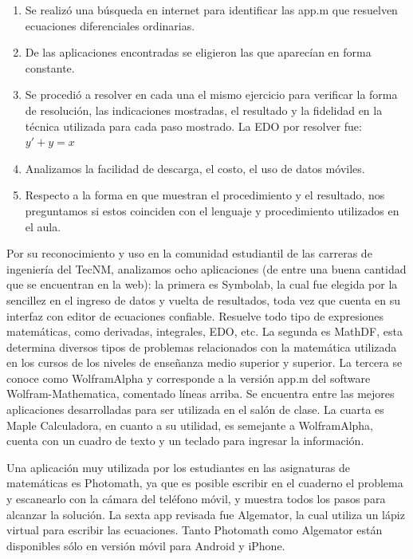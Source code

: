 \documentclass[spanish]{textolivre}
\begin{document}
\begin{enumerate}[label=(\alph*)]
\item Se realizó una búsqueda en internet para identificar las app.m que resuelven ecuaciones diferenciales ordinarias.
\item De las aplicaciones encontradas se eligieron las que aparecían en forma constante.
\item Se procedió a resolver en cada una el mismo ejercicio para verificar la forma de resolución, las indicaciones mostradas, el resultado y la fidelidad en la técnica utilizada para cada paso mostrado. La EDO por resolver fue: $y'+y=x$
\item Analizamos la facilidad de descarga, el costo, el uso de datos móviles.
\item Respecto a la forma en que muestran el procedimiento y el resultado, nos preguntamos si estos coinciden con el lenguaje y procedimiento utilizados en el aula.
\end{enumerate}

Por su reconocimiento y uso en la comunidad estudiantil de las carreras de ingeniería del TecNM, analizamos ocho aplicaciones (de entre una buena cantidad que se encuentran en la web): la primera es Symbolab, la cual fue elegida por la sencillez en el ingreso de datos y vuelta de resultados, toda vez que cuenta en su interfaz con editor de ecuaciones confiable. Resuelve todo tipo de expresiones matemáticas, como derivadas, integrales, EDO, etc. La segunda es MathDF, esta determina diversos tipos de problemas relacionados con la matemática utilizada en los cursos de los niveles de enseñanza medio superior y superior. La tercera se conoce como WolframAlpha y corresponde a la versión app.m del software Wolfram-Mathematica, comentado líneas arriba. Se encuentra entre las mejores aplicaciones desarrolladas para ser utilizada en el salón de clase. La cuarta es Maple Calculadora, en cuanto a su utilidad, es semejante a WolframAlpha, cuenta con un cuadro de texto y un teclado para ingresar la información.

Una aplicación muy utilizada por los estudiantes en las asignaturas de matemáticas es Photomath, ya que es posible escribir en el cuaderno el problema y escanearlo con la cámara del teléfono móvil, y muestra todos los pasos para alcanzar la solución. La sexta app revisada fue Algemator, la cual utiliza un lápiz virtual para escribir las ecuaciones.  Tanto Photomath como Algemator están disponibles sólo en versión móvil para Android y iPhone.
\end{document}
